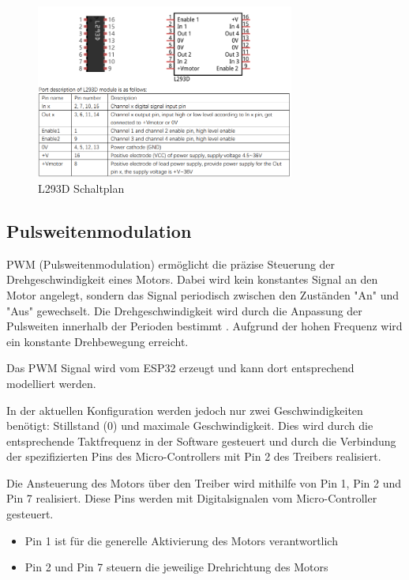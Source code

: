 \documentclass[conference,compsoc,final,a4paper]{IEEEtran}
\begin{document}
\begin{figure}[h]
  \centering
\includegraphics[width=8.5cm]{../images/L293D.png}
\caption{L293D Schaltplan\autocite{freenoveTutorial}}\label{Elektrik:L293D}
\end{figure}

\subsection{Pulsweitenmodulation}
PWM (Pulsweitenmodulation) ermöglicht die präzise Steuerung der Drehgeschwindigkeit eines Motors. Dabei wird kein konstantes Signal an den Motor angelegt,
sondern das Signal periodisch zwischen den Zuständen "An" und "Aus" gewechselt. Die Drehgeschwindigkeit wird durch die Anpassung der Pulsweiten innerhalb der Perioden 
bestimmt \autocite{611797}. Aufgrund der hohen Frequenz wird ein konstante Drehbewegung erreicht. 

\noindent Das PWM Signal wird vom ESP32 erzeugt und kann dort entsprechend modelliert werden. 

\noindent In der aktuellen Konfiguration werden jedoch nur zwei Geschwindigkeiten benötigt: Stillstand (0) und maximale Geschwindigkeit. 
Dies wird durch die entsprechende Taktfrequenz in der Software gesteuert und durch die Verbindung der 
spezifizierten Pins des Micro-Controllers mit Pin 2 des Treibers realisiert.

\noindent Die Ansteuerung des Motors über den Treiber wird mithilfe von Pin 1, Pin 2 und Pin 7 realisiert. 
Diese Pins werden mit Digitalsignalen vom Micro-Controller gesteuert.
\begin{itemize}
  \item Pin 1 ist für die generelle Aktivierung des Motors verantwortlich
  \item Pin 2 und Pin 7 steuern die jeweilige Drehrichtung des Motors
\end{itemize}
\end{document}

